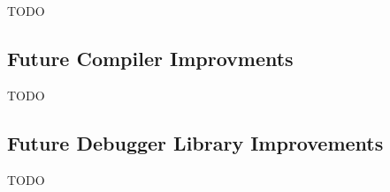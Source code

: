 
TODO


\subsection{Future Compiler Improvments}
TODO


\subsection{Future Debugger Library Improvements}
TODO

